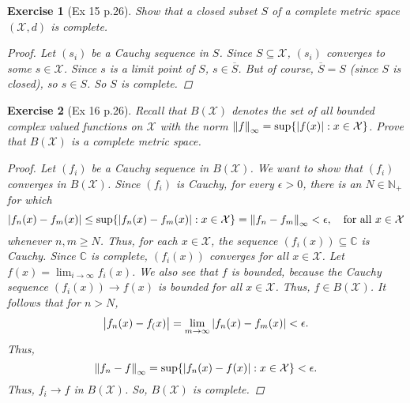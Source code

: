 \documentclass[11pt]{article}
\newtheorem{exercise}{Exercise}
\newcommand{\N}{\mathbb{N}}
\newcommand{\X}{\mathcal{X}}
\begin{document}
\begin{exercise}[Ex 15 p.26]
	Show that a closed subset $S$ of a complete metric space $(\X,d)$ is complete.
	\begin{proof}
		Let $(s_i)$ be a Cauchy sequence in $S$. Since $S\subseteq \X$, $(s_i)$ converges to some $s\in \X$. Since $s$ is a limit point of $S$, $s\in \overline{S}$. But of course, $\overline{S} =S$ (since $S$ is closed), so $s\in S$. So $S$ is complete. 
	\end{proof}
\end{exercise}

\begin{exercise}[Ex 16 p.26]
	Recall that $B(\X)$ denotes the set of all bounded complex valued functions
	on $\X$ with the norm $\norm{f}_\infty = \sup \{|f(x)| : x \in \X \}$. Prove that $B(\X)$ is a complete metric space.

	\begin{proof}
		Let $(f_i)$ be a Cauchy sequence in $B(\X)$. We want to show that $(f_i)$ converges in $B(\X)$. Since $(f_i)$ is Cauchy, for every $\epsilon > 0$, there is an $N\in \N_+$ for which 
		\begin{equation*}
		\abs{f_n(x) - f_m(x)} \leq \sup\{ \abs{f_n(x) - f_m(x)} : x\in \X  \} = \norm{f_n - f_m}_\infty  < \epsilon, \quad \mbox{for all } x\in \X
		\end{equation*}
		whenever $n,m \geq N$. Thus, for each $x\in \X$, the sequence $(f_i(x)) \subseteq \mathbb{C}$ is Cauchy. Since $\mathbb{C}$ is complete, $(f_i(x))$ converges for all $x\in \X$. Let $f(x) = \lim_{i\to \infty} f_i(x)$. We also see that $f$ is bounded, because the Cauchy sequence $(f_i(x)) \to f(x)$ is bounded for all $x\in \X$. Thus, $f\in B(\X)$. It follows that for $n > N$,
		\begin{equation*}
		\abs{f_n(x) - f_(x)} = \lim_{m\to \infty}\abs{f_n(x) - f_m(x)} < \epsilon.
		\end{equation*} 
		Thus, 
		\begin{equation*}
		\norm{f_n - f}_\infty = \sup\{ \abs{f_n(x) - f(x)} : x\in \X \} < \epsilon.
		\end{equation*}
		Thus, $f_i \to f$ in $B(\X)$. So, $B(\X)$ is complete.
		
		
	\end{proof}
\end{exercise}
\end{document}
